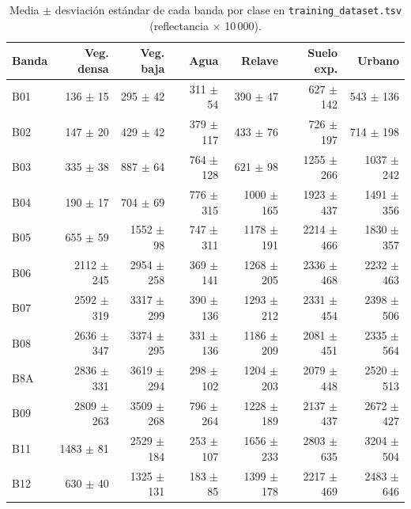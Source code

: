 \begin{table}[htbp]
 \centering
 \footnotesize
\setlength{\tabcolsep}{4pt}
 \caption{Media $\pm$ desviación estándar de cada banda por clase en \texttt{training\_dataset.tsv} (reflectancia $\times$ 10\,000).}
 \label{tab:estadistica}
 \begin{tabular}{lrrrrrr}
  \toprule
  Banda & Veg. densa & Veg. baja & Agua & Relave & Suelo exp. & Urbano \\
  \midrule
  B01 & 136 $\pm$ 15 & 295 $\pm$ 42 & 311 $\pm$ 54 & 390 $\pm$ 47 & 627 $\pm$ 142 & 543 $\pm$ 136 \\
  B02 & 147 $\pm$ 20 & 429 $\pm$ 42 & 379 $\pm$ 117 & 433 $\pm$ 76 & 726 $\pm$ 197 & 714 $\pm$ 198 \\
  B03 & 335 $\pm$ 38 & 887 $\pm$ 64 & 764 $\pm$ 128 & 621 $\pm$ 98 & 1255 $\pm$ 266 & 1037 $\pm$ 242 \\
  B04 & 190 $\pm$ 17 & 704 $\pm$ 69 & 776 $\pm$ 315 & 1000 $\pm$ 165 & 1923 $\pm$ 437 & 1491 $\pm$ 356 \\
  B05 & 655 $\pm$ 59 & 1552 $\pm$ 98 & 747 $\pm$ 311 & 1178 $\pm$ 191 & 2214 $\pm$ 466 & 1830 $\pm$ 357 \\
  B06 & 2112 $\pm$ 245 & 2954 $\pm$ 258 & 369 $\pm$ 141 & 1268 $\pm$ 205 & 2336 $\pm$ 468 & 2232 $\pm$ 463 \\
  B07 & 2592 $\pm$ 319 & 3317 $\pm$ 299 & 390 $\pm$ 136 & 1293 $\pm$ 212 & 2331 $\pm$ 454 & 2398 $\pm$ 506 \\
  B08 & 2636 $\pm$ 347 & 3374 $\pm$ 295 & 331 $\pm$ 136 & 1186 $\pm$ 209 & 2081 $\pm$ 451 & 2335 $\pm$ 564 \\
  B8A & 2836 $\pm$ 331 & 3619 $\pm$ 294 & 298 $\pm$ 102 & 1204 $\pm$ 203 & 2079 $\pm$ 448 & 2520 $\pm$ 513 \\
  B09 & 2809 $\pm$ 263 & 3509 $\pm$ 268 & 796 $\pm$ 264 & 1228 $\pm$ 189 & 2137 $\pm$ 437 & 2672 $\pm$ 427 \\
  B11 & 1483 $\pm$ 81 & 2529 $\pm$ 184 & 253 $\pm$ 107 & 1656 $\pm$ 233 & 2803 $\pm$ 635 & 3204 $\pm$ 504 \\
  B12 & 630 $\pm$ 40 & 1325 $\pm$ 131 & 183 $\pm$ 85 & 1399 $\pm$ 178 & 2217 $\pm$ 469 & 2483 $\pm$ 646 \\
  \bottomrule
 \end{tabular}
\end{table}

